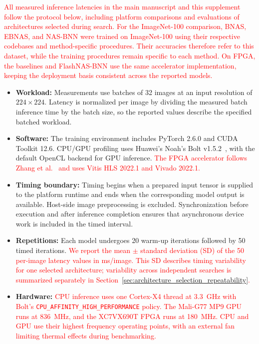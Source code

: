 \documentclass[preprint,review,12p,times]{elsarticle}
\begin{document}
\textcolor{red}{All measured inference latencies in the main manuscript and this supplement follow the protocol below, including platform comparisons and evaluations of architectures selected during search. For the ImageNet-100 comparison, BNAS, EBNAS, and NAS-BNN were trained on ImageNet-100 using their respective codebases and method-specific procedures. Their accuracies therefore refer to this dataset, while the training procedures remain specific to each method. On FPGA, the baselines and FlashNAS-BNN use the same accelerator implementation, keeping the deployment basis consistent across the reported models.}
\begin{itemize}
    \item \textbf{Workload:} Measurements use batches of 32 images at an input resolution of $224\times224$. Latency is normalized per image by dividing the measured batch inference time by the batch size, so the reported values describe the specified batched workload.
    \item \textbf{Software:} The training environment includes PyTorch 2.6.0 and CUDA Toolkit 12.6. CPU/GPU profiling uses Huawei's Noah's Bolt v1.5.2~\cite{Huawei2020}, with the default OpenCL backend for GPU inference. \textcolor{red}{The FPGA accelerator follows Zhang et al.~\cite{Zhang2025} and uses Vitis HLS 2022.1 and Vivado 2022.1.}
    \item \textbf{Timing boundary:} Timing begins when a prepared input tensor is supplied to the platform runtime and ends when the corresponding model output is available. Host-side image preprocessing is excluded. Synchronization before execution and after inference completion ensures that asynchronous device work is included in the timed interval.
    \item \textbf{Repetitions:} Each model undergoes 20 warm-up iterations followed by 50 timed iterations. \textcolor{red}{We report the mean $\pm$ standard deviation (SD) of the 50 per-image latency values in ms/image. This SD describes timing variability for one selected architecture; variability across independent searches is summarized separately in Section~\ref{sec:architecture_selection_repeatability}.}
    \item \textbf{Hardware:} \textcolor{red}{CPU inference uses one Cortex-X4 thread at 3.3~GHz with Bolt's \texttt{CPU\_AFFINITY\_HIGH\_PERFORMANCE} policy. The Mali-G77 MP9 GPU runs at 836~MHz, and the XC7VX690T FPGA runs at 180~MHz. CPU and GPU use their highest frequency operating points, with an external fan limiting thermal effects during benchmarking.}
\end{itemize}
\end{document}
